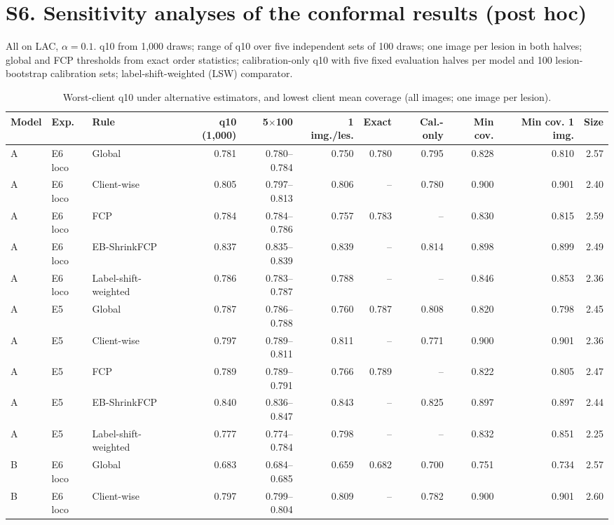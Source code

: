 \documentclass[10pt]{article}
\begin{document}
\section*{S6. Sensitivity analyses of the conformal results (post hoc)}
All on LAC, $\alpha=0.1$. q10 from 1,000 draws; range of q10 over five independent sets of 100 draws; one image per lesion in both halves; global and FCP thresholds from exact order statistics; calibration-only q10 with five fixed evaluation halves per model and 100 lesion-bootstrap calibration sets; label-shift-weighted (LSW) comparator.
\begin{table}[!htbp]
\centering
\scriptsize
\caption{Worst-client q10 under alternative estimators, and lowest client mean coverage (all images; one image per lesion).}
\label{tab:s6}
\begin{tabular}{@{}lllrrrrrrrr@{}}
\toprule
Model & Exp. & Rule & q10 (1,000) & 5$\times$100 & 1 img./les. & Exact & Cal.-only & Min cov. & Min cov. 1 img. & Size \\
\midrule
A & E6 loco & Global & 0.781 & 0.780--0.784 & 0.750 & 0.780 & 0.795 & 0.828 & 0.810 & 2.57 \\
A & E6 loco & Client-wise & 0.805 & 0.797--0.813 & 0.806 & -- & 0.780 & 0.900 & 0.901 & 2.40 \\
A & E6 loco & FCP & 0.784 & 0.784--0.786 & 0.757 & 0.783 & -- & 0.830 & 0.815 & 2.59 \\
A & E6 loco & EB-ShrinkFCP & 0.837 & 0.835--0.839 & 0.839 & -- & 0.814 & 0.898 & 0.899 & 2.49 \\
A & E6 loco & Label-shift-weighted & 0.786 & 0.783--0.787 & 0.788 & -- & -- & 0.846 & 0.853 & 2.36 \\
\midrule
A & E5 & Global & 0.787 & 0.786--0.788 & 0.760 & 0.787 & 0.808 & 0.820 & 0.798 & 2.45 \\
A & E5 & Client-wise & 0.797 & 0.789--0.811 & 0.811 & -- & 0.771 & 0.900 & 0.901 & 2.36 \\
A & E5 & FCP & 0.789 & 0.789--0.791 & 0.766 & 0.789 & -- & 0.822 & 0.805 & 2.47 \\
A & E5 & EB-ShrinkFCP & 0.840 & 0.836--0.847 & 0.843 & -- & 0.825 & 0.897 & 0.897 & 2.44 \\
A & E5 & Label-shift-weighted & 0.777 & 0.774--0.784 & 0.798 & -- & -- & 0.832 & 0.851 & 2.25 \\
\midrule
B & E6 loco & Global & 0.683 & 0.684--0.685 & 0.659 & 0.682 & 0.700 & 0.751 & 0.734 & 2.57 \\
B & E6 loco & Client-wise & 0.797 & 0.799--0.804 & 0.809 & -- & 0.782 & 0.900 & 0.901 & 2.60 \\

\end{tabular}
\end{table}
\end{document}
